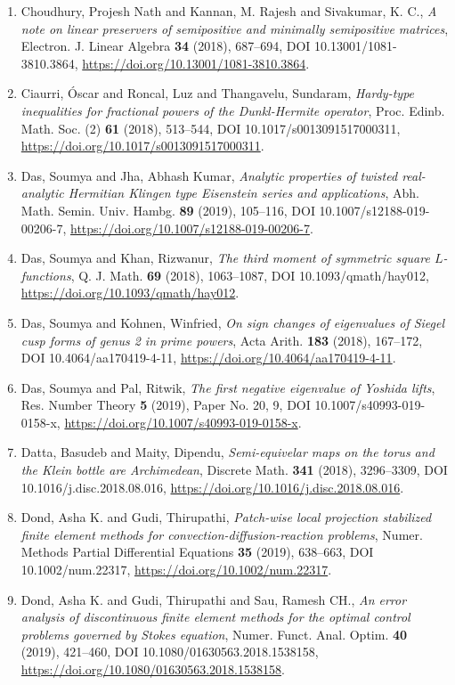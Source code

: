 \begin{enumerate}
\item Choudhury, Projesh Nath and Kannan, M. Rajesh and Sivakumar,
K. C., {\em A note on linear preservers of semipositive and minimally
semipositive matrices}, Electron. J. Linear Algebra {\bf 34} (2018), 687--694, DOI 10.13001/1081-3810.3864, \url{https://doi.org/10.13001/1081-3810.3864}.
\item Ciaurri, \'{O}scar and Roncal, Luz and Thangavelu, Sundaram, {\em Hardy-type inequalities for fractional powers of the
{D}unkl-{H}ermite operator}, Proc. Edinb. Math. Soc. (2) {\bf 61} (2018), 513--544, DOI 10.1017/s0013091517000311, \url{https://doi.org/10.1017/s0013091517000311}.
\item Das, Soumya and Jha, Abhash Kumar, {\em Analytic properties of twisted real-analytic {H}ermitian
{K}lingen type {E}isenstein series and applications}, Abh. Math. Semin. Univ. Hambg. {\bf 89} (2019), 105--116, DOI 10.1007/s12188-019-00206-7, \url{https://doi.org/10.1007/s12188-019-00206-7}.
\item Das, Soumya and Khan, Rizwanur, {\em The third moment of symmetric square {$L$}-functions}, Q. J. Math. {\bf 69} (2018), 1063--1087, DOI 10.1093/qmath/hay012, \url{https://doi.org/10.1093/qmath/hay012}.
\item Das, Soumya and Kohnen, Winfried, {\em On sign changes of eigenvalues of {S}iegel cusp forms of genus
2 in prime powers}, Acta Arith. {\bf 183} (2018), 167--172, DOI 10.4064/aa170419-4-11, \url{https://doi.org/10.4064/aa170419-4-11}.
\item Das, Soumya and Pal, Ritwik, {\em The first negative eigenvalue of {Y}oshida lifts}, Res. Number Theory {\bf 5} (2019), Paper No. 20, 9, DOI 10.1007/s40993-019-0158-x, \url{https://doi.org/10.1007/s40993-019-0158-x}.
\item Datta, Basudeb and Maity, Dipendu, {\em Semi-equivelar maps on the torus and the {K}lein bottle are
{A}rchimedean}, Discrete Math. {\bf 341} (2018), 3296--3309, DOI 10.1016/j.disc.2018.08.016, \url{https://doi.org/10.1016/j.disc.2018.08.016}.
\item Dond, Asha K. and Gudi, Thirupathi, {\em Patch-wise local projection stabilized finite element methods
for convection-diffusion-reaction problems}, Numer. Methods Partial Differential Equations {\bf 35} (2019), 638--663, DOI 10.1002/num.22317, \url{https://doi.org/10.1002/num.22317}.
\item Dond, Asha K. and Gudi, Thirupathi and Sau, Ramesh CH., {\em An error analysis of discontinuous finite element methods for
the optimal control problems governed by {S}tokes equation}, Numer. Funct. Anal. Optim. {\bf 40} (2019), 421--460, DOI 10.1080/01630563.2018.1538158, \url{https://doi.org/10.1080/01630563.2018.1538158}.

\end{enumerate}
